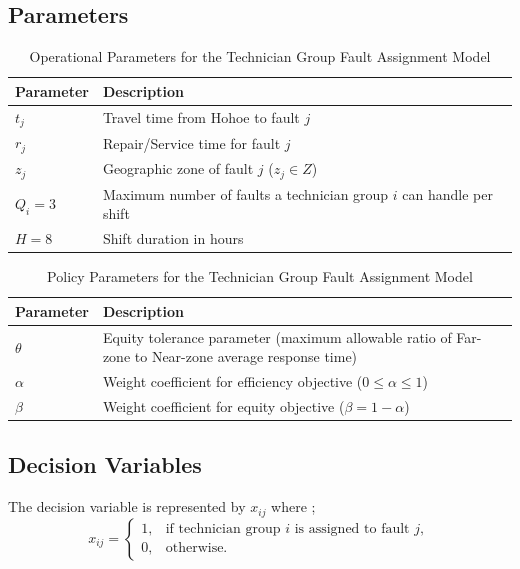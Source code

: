 \documentclass[11pt]{article}
\begin{document}
\subsection*{Parameters}
\begin{table}[h!]
\centering
\caption{Operational Parameters for the Technician Group Fault Assignment Model}
\label{tab:operational_parameters}
\begin{tabular}{l l}
\toprule
\textbf{Parameter} & \textbf{Description} \\
\midrule
$t_j$ & Travel time from Hohoe to fault $j$ \\
$r_j$ & Repair/Service time for fault $j$ \\
$z_j$ & Geographic zone of fault $j$ ($z_j \in Z$) \\
$Q_i = 3$ & Maximum number of faults a technician group $i$ can handle per shift \\
$H = 8$ & Shift duration in hours \\
\bottomrule
\end{tabular}
\end{table}



\begin{table}[h!]
\centering
\caption{Policy Parameters for the Technician Group Fault Assignment Model}
\label{tab:policy_parameters}
\begin{tabular}{l p{10cm}}
\toprule
\textbf{Parameter} & \textbf{Description} \\
\midrule
$\theta$ & Equity tolerance parameter (maximum allowable ratio of Far-zone to Near-zone average response time) \\
$\alpha$ & Weight coefficient for efficiency objective ($0 \leq \alpha \leq 1$) \\
$\beta$ & Weight coefficient for equity objective ($\beta = 1 - \alpha$) \\
\bottomrule
\end{tabular}
\end{table}


\subsection*{Decision Variables}

The decision variable is represented by $x_{ij}$ where ;\\
\[
x_{ij} =
\begin{cases}
1, & \text{if technician group } i \text{ is assigned to fault } j,\\
0, & \text{otherwise.}
\end{cases}
\]
\end{document}
